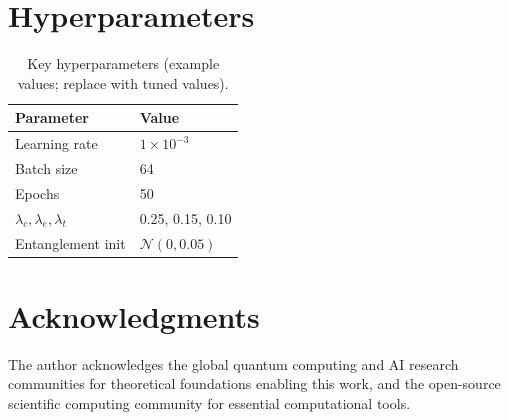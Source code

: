 \documentclass[conference]{IEEEtran}
\begin{document}
\section{Hyperparameters}
\begin{table}[h]
\centering
\caption{Key hyperparameters (example values; replace with tuned values).}
\begin{tabular}{@{}ll@{}}
\toprule
Parameter & Value \\ \midrule
Learning rate & $1\times10^{-3}$ \\
Batch size & 64 \\
Epochs & 50 \\
$\lambda_c, \lambda_e, \lambda_t$ & 0.25, 0.15, 0.10 \\
Entanglement init & $\mathcal{N}(0, 0.05)$ \\
\bottomrule
\end{tabular}
\end{table}

\section*{Acknowledgments}

The author acknowledges the global quantum computing and AI research communities for theoretical foundations enabling this work, and the open-source scientific computing community for essential computational tools.
\end{document}
